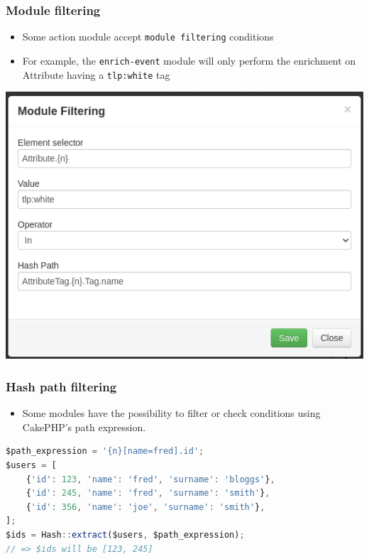 \begin{frame}
    \frametitle{Module filtering}
    \begin{itemize}
        \item Some action module accept \texttt{module filtering} conditions
        \item For example, the \texttt{enrich-event} module will only perform the enrichment on Attribute having a \texttt{tlp:white} tag
    \end{itemize}
    \begin{center}
        \includegraphics[width=0.7\linewidth]{pictures/module-filtering.png}
    \end{center}
\end{frame}

\begin{frame}[fragile]
    \frametitle{Hash path filtering}
    \begin{itemize}
        \item Some modules have the possibility to filter or check conditions using CakePHP's path expression.
    \end{itemize}
\begin{lstlisting}[language=javascript,firstnumber=1]
$path_expression = '{n}[name=fred].id';
$users = [
    {'id': 123, 'name': 'fred', 'surname': 'bloggs'},
    {'id': 245, 'name': 'fred', 'surname': 'smith'},
    {'id': 356, 'name': 'joe', 'surname': 'smith'},
];
$ids = Hash::extract($users, $path_expression);
// => $ids will be [123, 245]
\end{lstlisting}
\end{frame}

